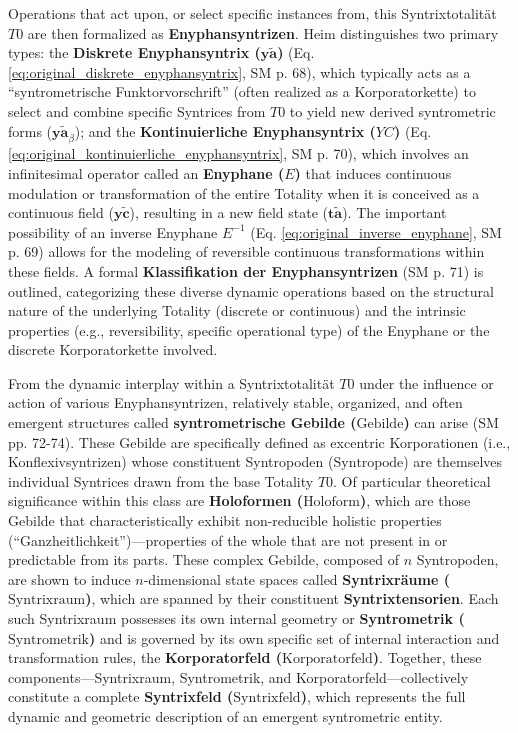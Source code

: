 \documentclass[12pt]{article}
\newcommand{\q}[1]{\enquote{#1}}
\newcommand{\syntropode}{\text{Syntropode}}
\newcommand{\syntrixtotalitaet}{T0}
\newcommand{\syntrixfeld}{\text{Syntrixfeld}}
\newcommand{\diskreteEnyphansyntrix}{\bm{y\widetilde{a}}}
\newcommand{\kontinuierlicheEnyphansyntrix}{YC}
\newcommand{\enyphane}{E}
\newcommand{\syntrometrischesGebilde}{\text{Gebilde}}
\newcommand{\holoform}{\text{Holoform}}
\newcommand{\syntrixraum}{\text{Syntrixraum}}
\newcommand{\syntrometrik}{\text{Syntrometrik}}
\newcommand{\korporatorfeld}{\text{Korporatorfeld}}
\begin{document}
Operations that act upon, or select specific instances from, this Syntrixtotalität \( \syntrixtotalitaet \) are then formalized as \textbf{Enyphansyntrizen}. Heim distinguishes two primary types: the \textbf{Diskrete Enyphansyntrix (\( \diskreteEnyphansyntrix \))} (Eq. \eqref{eq:original_diskrete_enyphansyntrix}, SM p. 68), which typically acts as a \q{syntrometrische Funktorvorschrift} (often realized as a Korporatorkette) to select and combine specific Syntrices from \( \syntrixtotalitaet \) to yield new derived syntrometric forms (\( \diskreteEnyphansyntrix_\beta \)); and the \textbf{Kontinuierliche Enyphansyntrix (\( \kontinuierlicheEnyphansyntrix \))} (Eq. \eqref{eq:original_kontinuierliche_enyphansyntrix}, SM p. 70), which involves an infinitesimal operator called an \textbf{Enyphane (\( \enyphane \))} that induces continuous modulation or transformation of the entire Totality when it is conceived as a continuous field (\(\mathbf{y\widetilde{c}}\)), resulting in a new field state (\( \mathbf{t\widetilde{a}} \)). The important possibility of an inverse Enyphane \( \enyphane^{-1} \) (Eq. \eqref{eq:original_inverse_enyphane}, SM p. 69) allows for the modeling of reversible continuous transformations within these fields. A formal \textbf{Klassifikation der Enyphansyntrizen} (SM p. 71) is outlined, categorizing these diverse dynamic operations based on the structural nature of the underlying Totality (discrete or continuous) and the intrinsic properties (e.g., reversibility, specific operational type) of the Enyphane or the discrete Korporatorkette involved.

From the dynamic interplay within a Syntrixtotalität \( \syntrixtotalitaet \) under the influence or action of various Enyphansyntrizen, relatively stable, organized, and often emergent structures called \textbf{syntrometrische Gebilde (\(\syntrometrischesGebilde\))} can arise (SM pp. 72-74). These Gebilde are specifically defined as excentric Korporationen (i.e., Konflexivsyntrizen) whose constituent Syntropoden (\(\syntropode\)) are themselves individual Syntrices drawn from the base Totality \( \syntrixtotalitaet \). Of particular theoretical significance within this class are \textbf{Holoformen (\(\holoform\))}, which are those Gebilde that characteristically exhibit non-reducible holistic properties (\q{Ganzheitlichkeit})—properties of the whole that are not present in or predictable from its parts. These complex Gebilde, composed of \(n\) Syntropoden, are shown to induce \( n \)-dimensional state spaces called \textbf{Syntrixräume (\(\syntrixraum\))}, which are spanned by their constituent \textbf{Syntrixtensorien}. Each such Syntrixraum possesses its own internal geometry or \textbf{Syntrometrik (\(\syntrometrik\))} and is governed by its own specific set of internal interaction and transformation rules, the \textbf{Korporatorfeld (\(\korporatorfeld\))}. Together, these components—Syntrixraum, Syntrometrik, and Korporatorfeld—collectively constitute a complete \textbf{Syntrixfeld (\(\syntrixfeld\))}, which represents the full dynamic and geometric description of an emergent syntrometric entity.
\end{document}
